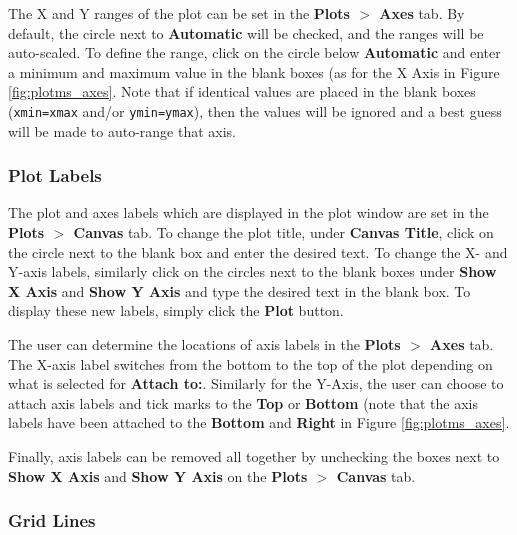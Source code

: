 The X and Y ranges of the plot can be set in the {\bf Plots $>$ Axes}
tab. By default, the circle next to {\bf Automatic} will be checked,
and the ranges will be auto-scaled. To define the range, click on the
circle below {\bf Automatic} and enter a minimum and maximum value in
the blank boxes (as for the X Axis in Figure
\ref{fig:plotms_axes}. Note that if identical values are placed in the
blank boxes ({\tt xmin=xmax} and/or {\tt ymin=ymax}), then the values
will be ignored and a best guess will be made to auto-range that axis.


\subsubsection{Plot Labels}
\label{section:edit.plot.plotms.labels}

The plot and axes labels which are displayed in the plot window are
set in the {\bf Plots $>$ Canvas} tab. To change the plot title, under
{\bf Canvas Title}, click on the circle next to the blank box and
enter the desired text. 
To change the X- and Y-axis labels, similarly click on the circles
next to the blank boxes under {\bf Show X Axis} and {\bf Show Y Axis}
and type the desired text in the blank box. To display these new
labels, simply click the {\bf Plot} button.

The user can determine the locations of axis labels in the {\bf Plots
  $>$ Axes} tab. The X-axis label switches from the bottom to the top
of the plot depending on what is selected for {\bf Attach
  to:}. Similarly for the Y-Axis, the user can choose to attach axis
labels and tick marks to the {\bf Top} or {\bf Bottom} (note that the
axis labels have been attached to the {\bf Bottom} and {\bf Right} in
Figure \ref{fig:plotms_axes}.

Finally, axis labels can be removed all together by unchecking the
boxes next to {\bf Show X Axis} and {\bf Show Y Axis} on the {\bf
  Plots $>$ Canvas} tab.


\subsubsection{Grid Lines}
\label{section:edit.plot.plotms.grid}


